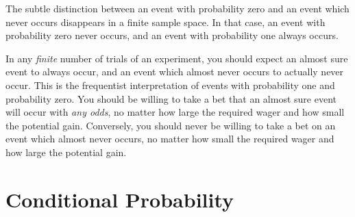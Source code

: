 \par
\rmk The subtle distinction between an event with probability zero and an event which never occurs disappears in a finite sample space. In that case, an event with probability zero never occurs, and an event with probability one always occurs. 
\par
In any \emph{finite} number of trials of an experiment, you should expect an almost sure event to always occur, and an event which almost never occurs to actually never occur. This is the frequentist interpretation of events with probability one and probability zero. You should be willing to take a bet that an almost sure event will occur with \emph{any odds}, no matter how large the required wager and how small the potential gain. Conversely, you should never be willing to take a bet on an event which almost never occurs, no matter how small the required wager and how large the potential gain.

\section{Conditional Probability}\label{condprobsection}

